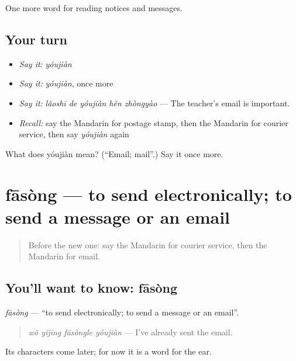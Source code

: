 \begin{grammarlens}[title={What you've built}]
One more word for reading notices and messages.
\end{grammarlens}

\subsection*{Your turn}
\begin{itemize}
\raggedright
  \item \emph{Say it:} \emph{yóujiàn}
  \item \emph{Say it:} \emph{yóujiàn}, once more
  \item \emph{Say it:} \emph{lǎoshī de yóujiàn hěn zhòngyào} — The teacher's email is important.
  \item \emph{Recall:} say the Mandarin for postage stamp, then the Mandarin for courier service, then say \emph{yóujiàn} again
\end{itemize}

\begin{tcolorbox}[breakable,colback=teal!4,colframe=teal!35!black,title={Before you move on}]
What does yóujiàn mean? (\textquotedblleft{}Email; mail\textquotedblright{}.) Say it once more.
\end{tcolorbox}
\section[fāsòng]{fāsòng — to send electronically; to send a message or an email}

\label{lesson:ZH-C201-fasong}



\begin{quote}
Before the new one: say the Mandarin for courier service, then the Mandarin for email.
\end{quote}

\subsection*{You'll want to know: fāsòng}
\emph{fāsòng} — \textquotedblleft{}to send electronically; to send a message or an email\textquotedblright{}.

\begin{quote}
\emph{wǒ yǐjīng fāsòngle yóujiàn} — I've already sent the email.
\end{quote}

Its characters come later; for now it is a word for the ear.

